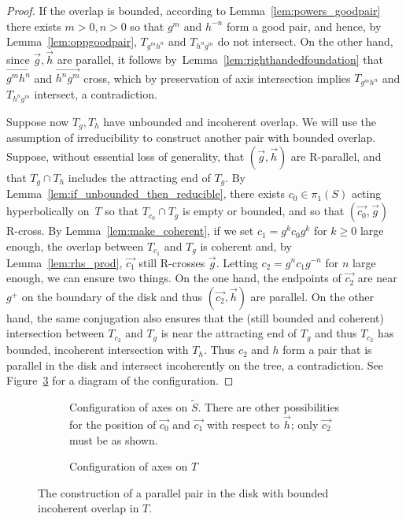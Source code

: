 \documentclass[11pt]{amsart}
\newcommand{\ora}[1]{\overrightarrow{#1}}
\newcommand*{\svgfignormal}[1]{\fontsize{9pt}{9pt}\selectfont}
\numberwithin{equation}{section}
\numberwithin{figure}{section}
\theoremstyle{definition}
\theoremstyle{plain}
\newcommand*{\wt}[1]{\widetilde{#1}}
\begin{document}
\begin{proof}
    If the overlap is bounded, according to
    Lemma~\ref{lem:powers_goodpair} there exists $m>0,n>0$ so that
    $g^m$ and $h^{-n}$ form a good pair, and hence, by
    Lemma~\ref{lem:oppgoodpair}, $T_{g^mh^n}$ and $T_{h^ng^m}$
    do not intersect. On the other hand, since $\ora{g},\ora{h}$ are
    parallel, it follows by~Lemma~\ref{lem:righthandedfoundation} that
    $\ora{g^mh^n}$ and $\ora{h^ng^m}$ cross, which by preservation of
    axis intersection implies $T_{g^mh^n}$ and $T_{h^ng^m}$  intersect, a
    contradiction.

    Suppose now $T_g,T_h$ have unbounded and incoherent overlap. We will use
    the assumption of irreducibility to construct another pair with
    bounded overlap. Suppose, without essential loss of generality,
    that $(\ora{g},\ora{h})$ are R-parallel,
    and that $T_g \cap T_h$ includes the attracting end of $T_g$. By
    Lemma~\ref{lem:if_unbounded_then_reducible}, there exists
    $c_0 \in \pi_1(S)$ acting hyperbolically on~$T$ so that
    $T_{c_0} \cap T_g$ is empty or bounded, and so that
    $(\ora{c_0},\ora{g})$ R-cross.
    By
    Lemma~\ref{lem:make_coherent}, if we set $c_1=g^kc_0 g^k$ for
    $k \geq 0$ large enough, the overlap between $T_{c_1}$ and $T_g$
    is coherent and, by Lemma~\ref{lem:rhs_prod}, $\ora{c_1}$ still
    R-crosses $\ora{g}$. Letting $c_2=g^n c_1 g^{-n}$ for $n$ large
    enough, we can ensure two things. On the one hand, the endpoints of
    $\ora{c_2}$ are near $g^+$ on the boundary of the disk and thus
    $(\ora{c_2},\ora{h})$ are
    parallel. On the other hand, the same conjugation also ensures
    that the (still bounded and coherent) intersection between
    $T_{c_2}$ and $T_g$ is near the attracting end of $T_g$ and thus
    $T_{c_2}$ has bounded, incoherent intersection with $T_h$. Thus
    $c_2$ and $h$ form a pair that is parallel in the disk and
    intersect incoherently on the tree, a contradiction.
   See Figure~\ref{fig:tree_bounded_incoherent} for a diagram of the
   configuration.
   \end{proof}

\begin{figure}
  \begin{subfigure}[c]{0.45\textwidth}
    \centering
    \svgfignormal{k_crossing_14}
    \caption{Configuration of axes on $\wt{S}$. There are other
      possibilities for the position of
      $\ora{c_0}$ and $\ora{c_1}$ with respect to $\ora{h}$; only
      $\ora{c_2}$ must be as shown.}
    \label{fig:k_crossing_14}
  \end{subfigure}
  \hfill
  \begin{subfigure}[c]{0.45\textwidth}
    \centering
    \svgfignormal{tree_bounded_incoherent}
    \caption{Configuration of axes on $T$}
    \label{fig:tree_k_crossing_14}
  \end{subfigure}
  \caption{The construction of a parallel pair in the disk with bounded incoherent overlap in $T$.}
  \label{fig:tree_bounded_incoherent}
\end{figure}
\end{document}
